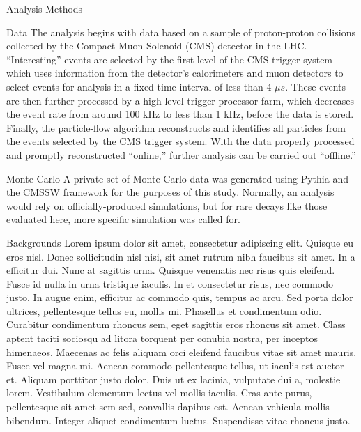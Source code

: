 \begin{section}{Analysis Methods}
\begin{subsection}{Data}
The analysis begins with data based on a sample of proton-proton collisions collected by the Compact Muon Solenoid (CMS) detector in the LHC. ``Interesting'' events are selected by the first level of the CMS trigger system which uses information from the detector's calorimeters and muon detectors to select events for analysis in a fixed time interval of less than 4 $\mu s$. These events are then further processed by a high-level trigger processor farm, which decreases the event rate from around 100 kHz to less than 1 kHz, before the data is stored. Finally, the particle-flow algorithm reconstructs and identifies all particles from the events selected by the CMS trigger system. With the data properly processed and promptly reconstructed ``online,'' further analysis can be carried out ``offline.''
\end{subsection}
\begin{subsection}{Monte Carlo}
A private set of Monte Carlo data was generated using Pythia and the CMSSW framework for the purposes of this study. Normally, an analysis would rely on officially-produced simulations, but for rare decays like those evaluated here, more specific simulation was called for.
\end{subsection}
\begin{subsection}{Backgrounds}
Lorem ipsum dolor sit amet, consectetur adipiscing elit. Quisque eu eros nisl. Donec sollicitudin nisl nisi, sit amet rutrum nibh faucibus sit amet. In a efficitur dui. Nunc at sagittis urna. Quisque venenatis nec risus quis eleifend. Fusce id nulla in urna tristique iaculis. In et consectetur risus, nec commodo justo. In augue enim, efficitur ac commodo quis, tempus ac arcu. Sed porta dolor ultrices, pellentesque tellus eu, mollis mi. Phasellus et condimentum odio. Curabitur condimentum rhoncus sem, eget sagittis eros rhoncus sit amet. Class aptent taciti sociosqu ad litora torquent per conubia nostra, per inceptos himenaeos. Maecenas ac felis aliquam orci eleifend faucibus vitae sit amet mauris. Fusce vel magna mi. Aenean commodo pellentesque tellus, ut iaculis est auctor et.
Aliquam porttitor justo dolor. Duis ut ex lacinia, vulputate dui a, molestie lorem. Vestibulum elementum lectus vel mollis iaculis. Cras ante purus, pellentesque sit amet sem sed, convallis dapibus est. Aenean vehicula mollis bibendum. Integer aliquet condimentum luctus. Suspendisse vitae rhoncus justo.
\end{subsection}
\end{section}

